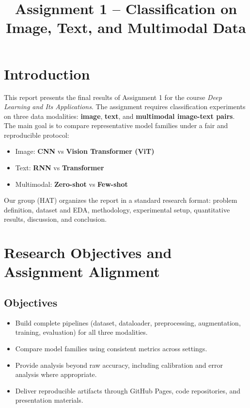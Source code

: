 \documentclass[twoside,final]{hcmut-report}
\title{Assignment 1 -- Classification on Image, Text, and Multimodal Data}
\begin{document}
\coverpage

\tableofcontents
\listoffigures
\listoftables
\newpage

\section{Introduction}

This report presents the final results of Assignment 1 for the course \textit{Deep Learning and Its Applications}. The assignment requires classification experiments on three data modalities: \textbf{image}, \textbf{text}, and \textbf{multimodal image-text pairs}. The main goal is to compare representative model families under a fair and reproducible protocol:
\begin{itemize}[leftmargin=*, nosep]
    \item Image: \textbf{CNN} vs \textbf{Vision Transformer (ViT)}
    \item Text: \textbf{RNN} vs \textbf{Transformer}
    \item Multimodal: \textbf{Zero-shot} vs \textbf{Few-shot}
\end{itemize}

Our group (HAT) organizes the report in a standard research format: problem definition, dataset and EDA, methodology, experimental setup, quantitative results, discussion, and conclusion.

\section{Research Objectives and Assignment Alignment}

\subsection{Objectives}
\begin{itemize}[leftmargin=*, nosep]
    \item Build complete pipelines (dataset, dataloader, preprocessing, augmentation, training, evaluation) for all three modalities.
    \item Compare model families using consistent metrics across settings.
    \item Provide analysis beyond raw accuracy, including calibration and error analysis where appropriate.
    \item Deliver reproducible artifacts through GitHub Pages, code repositories, and presentation materials.
\end{itemize}
\end{document}
